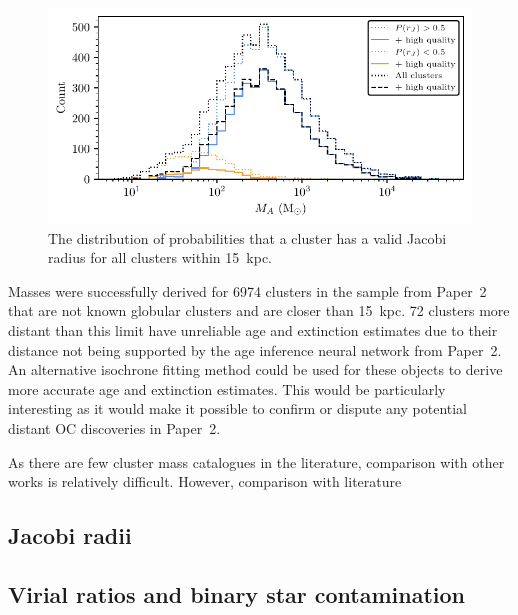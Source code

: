 \begin{figure}[t]
    \centering
    \includegraphics[width=\textwidth]{fig/c4/results_mass_distribution.pdf}
    \caption[The distribution of probabilities that a cluster has a valid Jacobi radius]{The distribution of probabilities that a cluster has a valid Jacobi radius for all clusters within 15~kpc.}
    \label{fig:dynamics:results:jacobi_radii_distribution}
\end{figure}

Masses were successfully derived for 6974 clusters in the sample from Paper~2 that are not known globular clusters and are closer than 15~kpc. 72 clusters more distant than this limit have unreliable age and extinction estimates due to their distance not being supported by the age inference neural network from Paper~2. An alternative isochrone fitting method could be used for these objects to derive more accurate age and extinction estimates. This would be particularly interesting as it would make it possible to confirm or dispute any potential distant OC discoveries in Paper~2.

As there are few cluster mass catalogues in the literature, comparison with other works is relatively difficult. However, comparison with literature 


\subsection{Jacobi radii}
\label{sec:dynamics:results:radii}




\subsection{Virial ratios and binary star contamination}
\label{sec:dynamics:results:virial}

